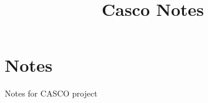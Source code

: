 \documentclass{article}
\title{
    Casco Notes
}
\date{}
\begin{document}
\section{Notes}
Notes for CASCO project
\end{document}
